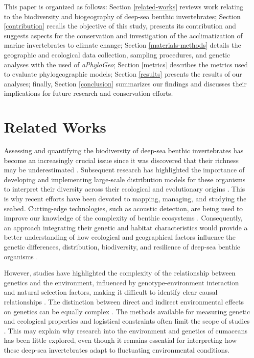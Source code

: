 This paper is organized as follows: Section \autoref{related-works} reviews work relating to the biodiversity and biogeography of deep-sea benthic invertebrates; Section \autoref{contribution} recalls the objective of this study, presents its contribution and suggests aspects for the conservation and investigation of the acclimatization of marine invertebrates to climate change; Section \autoref{materials-methods} details the geographic and ecological data collection, sampling procedures, and genetic analyses with the used of \textit{aPhyloGeo}; Section \autoref{metrics} describes the metrics used to evaluate phylogeographic models; Section \autoref{results} presents the results of our analyses; finally, Section \autoref{conclusion} summarizes our findings and discusses their implications for future research and conservation efforts.

\section{Related Works}\label{related-works}
Assessing and quantifying the biodiversity of deep-sea benthic invertebrates has become an increasingly crucial issue since it was discovered that their richness may be underestimated \citep{grassle1992deep}. Subsequent research has highlighted the importance of developing and implementing large-scale distribution models for these organisms to interpret their diversity across their ecological and evolutionary origins \citep{rex1997large}. This is why recent efforts have been devoted to mapping, managing, and studying the seabed. Cutting-edge technologies, such as acoustic detection, are being used to improve our knowledge of the complexity of benthic ecosystems \citep{brown2011benthic}. Consequently, an approach integrating their genetic and habitat characteristics would provide a better understanding of how ecological and geographical factors influence the genetic differences, distribution, biodiversity, and resilience of deep-sea benthic organisms \citep{etter1990population, vrijenhoek2009cryptic}.

However, studies have highlighted the complexity of the relationship between genetics and the environment, influenced by genotype-environment interaction and natural selection factors, making it difficult to identify clear causal relationships \citep{balkenhol_identifying_2009}. The distinction between direct and indirect environmental effects on genetics can be equally complex \citep{manel_perspectives_2010, balkenhol_landscape_2019}. The methods available for measuring genetic and ecological properties and logistical constraints often limit the scope of studies \citep{manel_perspectives_2010, shafer_widespread_2013}. This may explain why research into the environment and genetics of cumaceans has been little explored, even though it remains essential for interpreting how these deep-sea invertebrates adapt to fluctuating environmental conditions.

